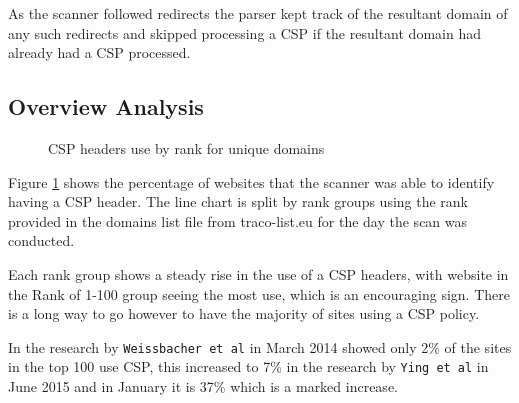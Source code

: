 \documentclass{mscreport}
\begin{document}
\vspace{0.3cm} \noindent
As the scanner followed redirects the parser kept track of the resultant domain of any such redirects and skipped processing a CSP if the resultant domain had already had a CSP processed.

\clearpage

\subsection{Overview Analysis}

\begin{figure}[H]
	\begin{center}
		\caption{CSP headers use by rank for unique domains}
		\label{fig:csp_by_rank}
	\end{center}
\end{figure}

\noindent
Figure \ref{fig:csp_by_rank} shows the percentage of websites that the scanner was able to identify having a CSP header. The line chart is split by rank groups using the rank provided in the domains list file from traco-list.eu for the day the scan was conducted.

\vspace{0.3cm} \noindent
Each rank group shows a steady rise in the use of a CSP headers, with website in the Rank of 1-100 group seeing the most use, which is an encouraging sign. There is a long way to go however to have the majority of sites using a CSP policy.

\vspace{0.3cm} \noindent
In the research by \texttt{Weissbacher et al} \cite{Weissbacher2014-vm} in March 2014 showed only 2\% of the sites in the top 100 use CSP, this increased to 7\% in the research by \texttt{Ying et al} \cite{Ying2016-ag} in June 2015 and in January it is 37\% which is a marked increase.
\end{document}
